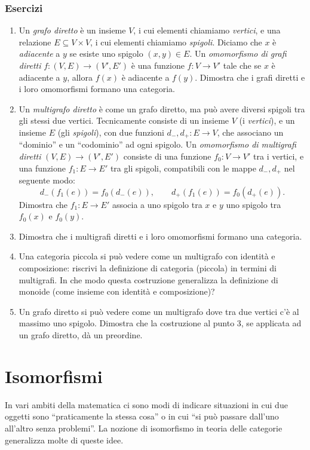 \subsubsection*{Esercizi}
\begin{enumerate}
    \item Un \emph{grafo diretto} è un insieme $V$, i cui elementi chiamiamo \emph{vertici}, e una relazione $E\subseteq V\times V$, i cui elementi chiamiamo \emph{spigoli}. Diciamo che $x$ è \emph{adiacente} a $y$ se esiste uno spigolo $(x,y)\in E$. Un \emph{omomorfismo di grafi diretti} $f:(V,E)\to (V',E')$ è una funzione $f:V\to V'$ tale che se $x$ è adiacente a $y$, allora $f(x)$ è adiacente a $f(y)$. Dimostra che i grafi diretti e i loro omomorfismi formano una categoria.
    \item Un \emph{multigrafo diretto} è come un grafo diretto, ma può avere diversi spigoli tra gli stessi due vertici. Tecnicamente consiste di un insieme $V$ (i \emph{vertici}), e un insieme $E$ (gli \emph{spigoli}), con due funzioni $d_-,d_+:E\to V$, che associano un ``dominio'' e un ``codominio'' ad ogni spigolo. Un \emph{omomorfismo di multigrafi diretti} $(V,E)\to (V',E')$ consiste di una funzione $f_0:V\to V'$ tra i vertici, e una funzione $f_1:E\to E'$ tra gli spigoli, compatibili con le mappe $d_-,d_+$ nel seguente modo:
    \[
    d_-(f_1(e)) = f_0(d_-(e)) ,\qquad d_+(f_1(e)) = f_0(d_+(e)) .
    \]
    Dimostra che $f_1:E\to E'$ associa a uno spigolo tra $x$ e $y$ uno spigolo tra $f_0(x)$ e $f_0(y)$.
    \item Dimostra che i multigrafi diretti e i loro omomorfismi formano una categoria.
    \item Una categoria piccola si può vedere come un multigrafo con identità e composizione: riscrivi la definizione di categoria (piccola) in termini di multigrafi.  In che modo questa costruzione generalizza la definizione di monoide (come insieme con identità e composizione)?
    \item Un grafo diretto si può vedere come un multigrafo dove tra due vertici c'è al massimo uno spigolo. Dimostra che la costruzione al punto 3, se applicata ad un grafo diretto, dà un preordine.
\end{enumerate}


\section{Isomorfismi}\label{isomorfismi}

In vari ambiti della matematica ci sono modi di indicare situazioni in cui due oggetti sono ``praticamente la stessa cosa'' o in cui ``si può passare dall'uno all'altro senza problemi''. La nozione di isomorfismo in teoria delle categorie generalizza molte di queste idee.


